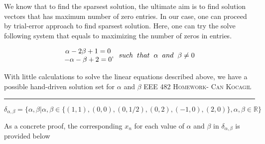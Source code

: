 \documentclass[12pt]{amsart}
\begin{document}
We know that to find the sparsest solution, the ultimate aim is to find solution vectors that has maximum number of zero entries. In our case, one can proceed by trial-error approach to find sparsest solution. Here, one can try the solve following system that equals to maximizing the number of zeros in entries. 

\[
\begin{matrix}
\alpha - 2\beta + 1 = 0\\
-\alpha -\beta + 2 = 0
\end{matrix}
\begin{matrix}
,\hspace{2mm}such \hspace{2mm} that \hspace{2mm}\alpha\hspace{2mm} and\hspace{2mm} \beta \neq 0
\end{matrix}
\]

With little calculations to solve the linear equations described above, we have a possible hand-driven solution set for $\alpha$ and $\beta$
\newpage
{\scshape EEE 482} \hfill {\scshape \large  Homework-\relax} \hfill {\scshape Can Kocagil}
\smallskip
\hrule


\begin{equation}
    \delta_{\alpha,\beta} = \{\alpha,\beta |\alpha,\beta \in \{(1,1),(0,0), (0,1/2), (0,2), (-1,0), (2,0)\},\alpha,\beta \in \mathbb{R}\}
\end{equation}

As a concrete proof, the corresponding $x_n$ for each value of $\alpha$ and $\beta$ in $\delta_{\alpha,\beta}$ is provided below
\end{document}
